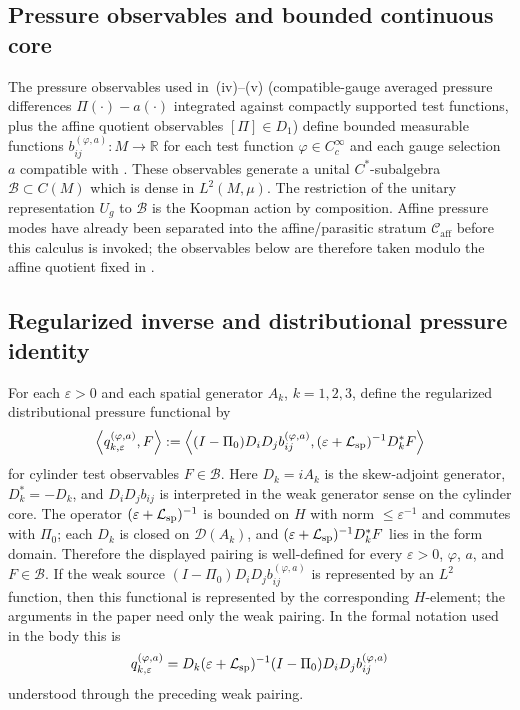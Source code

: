 \documentclass[11pt]{amsart}
\numberwithin{equation}{section}
\theoremstyle{plain}
\theoremstyle{definition}
\theoremstyle{remark}
\newcommand{\Caff}{\mathcal C_{\mathrm{aff}}}
\begin{document}
\subsection{Pressure observables and bounded continuous core}
The pressure observables used in
\,(iv)--(v) (compatible-gauge averaged
pressure differences \(\Pi(\cdot)-a(\cdot)\) integrated against compactly
supported test functions, plus the affine quotient observables
\([\Pi]\in D_1\)) define bounded measurable functions
\(b_{ij}^{(\varphi,a)}\colon M\to\mathbb R\) for each test function
\(\varphi\in C_c^\infty\) and each gauge selection \(a\) compatible with
.  These observables generate a
unital \(C^*\)-subalgebra
\(\mathcal B\subset C(M)\) which is dense in \(L^2(M,\mu)\).  The
restriction of the unitary representation \(U_g\) to \(\mathcal B\) is the
Koopman action by composition.
Affine pressure modes have already been separated into the
affine/parasitic stratum \(\Caff\) before this calculus is invoked; the
observables below are therefore taken modulo the affine quotient fixed in
.

\subsection{Regularized inverse and distributional pressure identity}
For each \(\varepsilon>0\) and each spatial generator \(A_k\),
\(k=1,2,3\), define the
regularized distributional pressure functional by
\[
   \left\langle q_{k,\varepsilon}^{(\varphi,a)},F\right\rangle
   :=
   \left\langle
      (I-\Pi_0)D_iD_j b_{ij}^{(\varphi,a)},
      (\varepsilon+\mathcal L_{\rm sp})^{-1}D_k^*F
   \right\rangle
\]
for cylinder test observables \(F\in\mathcal B\).  Here \(D_k=iA_k\) is the
skew-adjoint generator, \(D_k^*=-D_k\), and \(D_iD_jb_{ij}\) is interpreted in
the weak generator sense on the cylinder core.  The operator
\((\varepsilon+\mathcal L_{\rm sp})^{-1}\) is bounded on \(H\) with
norm \(\le\varepsilon^{-1}\) and commutes with \(\Pi_0\); each \(D_k\) is
closed on \(\mathcal D(A_k)\), and
\((\varepsilon+\mathcal L_{\rm sp})^{-1}D_k^*F\) lies in the form domain.  Therefore the
displayed pairing is well-defined for every \(\varepsilon>0\), \(\varphi\),
\(a\), and \(F\in\mathcal B\).  If the weak source
\((I-\Pi_0)D_iD_jb_{ij}^{(\varphi,a)}\) is represented by an \(L^2\) function,
then this functional is represented by the corresponding \(H\)-element; the
arguments in the paper need only the weak pairing.
In the formal notation used in the body this is
\[
   q_{k,\varepsilon}^{(\varphi,a)}
   =
   D_k(\varepsilon+\mathcal L_{\rm sp})^{-1}
   (I-\Pi_0)D_iD_jb_{ij}^{(\varphi,a)}
\]
understood through the preceding weak pairing.
\end{document}
